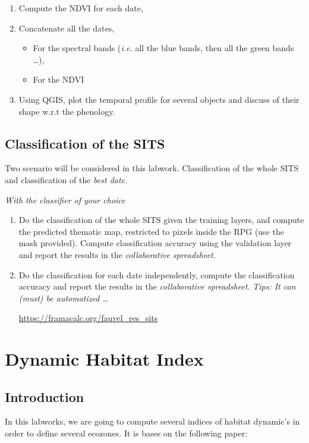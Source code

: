 \documentclass[a4paper,11pt,DIV=18]{scrartcl}
\begin{document}
\begin{work}
\begin{enumerate}
\item Compute the NDVI for each date,
\item Concatenate all the dates,
\begin{itemize}
\item For  the spectral bands  (\emph{i.e.} all the  blue bands, then  all the
green bands \ldots{}),
\item For the NDVI
\end{itemize}
\item Using QGIS,  plot the  temporal  profile for  several objects  and
discuss of their shape w.r.t the phenology.
\end{enumerate}
\end{work}
\subsection{Classification of the SITS}
\label{sec:org9724176}
Two scenario will be considered in this labwork. Classification of the
whole SITS and classification of the \emph{best date.}

\begin{work}
\emph{With the classifier of your choice}
\begin{enumerate}
\item Do the classification of the  whole SITS given the training layers,
and compute the predicted thematic map, restricted to pixels inside
the RPG  (use the  mask provided). Compute  classification accuracy
using  the  validation   layer  and  report  the   results  in  the
\emph{collaborative spreadsheet}.
\item Do the  classification for  each date  independently, compute  the
classification accuracy and report the results in the \emph{collaborative
spreadsheet}. \emph{Tips: It can (must) be automatized \ldots{}}

\url{https://framacalc.org/fauvel\_res\_sits}
\end{enumerate}
\end{work}
\section{Dynamic Habitat Index}
\label{sec:orgb4141ab}
\subsection{Introduction}
\label{sec:org3b4ae75}
In this labworks, we are going to compute several indices of habitat
dynamic's in order to define several ecozones. It is bases on the
following paper: 
\end{document}
